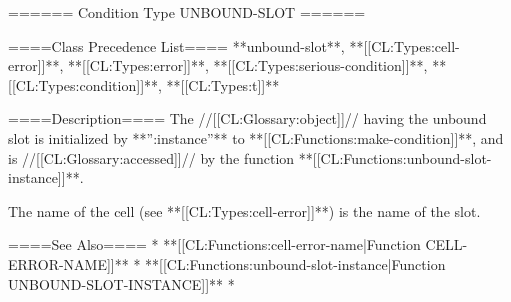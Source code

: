====== Condition Type UNBOUND-SLOT ======

====Class Precedence List==== 
**unbound-slot**, **[[CL:Types:cell-error]]**, **[[CL:Types:error]]**, **[[CL:Types:serious-condition]]**, **[[CL:Types:condition]]**, **[[CL:Types:t]]**

====Description====
The //[[CL:Glossary:object]]// having the unbound slot is initialized by **'':instance''** to **[[CL:Functions:make-condition]]**, and is //[[CL:Glossary:accessed]]// by the function **[[CL:Functions:unbound-slot-instance]]**.

The name of the cell (see **[[CL:Types:cell-error]]**) is the name of the slot.

====See Also====
  * **[[CL:Functions:cell-error-name|Function CELL-ERROR-NAME]]**
  * **[[CL:Functions:unbound-slot-instance|Function UNBOUND-SLOT-INSTANCE]]**
  * {\secref\ConditionSystemConcepts}

